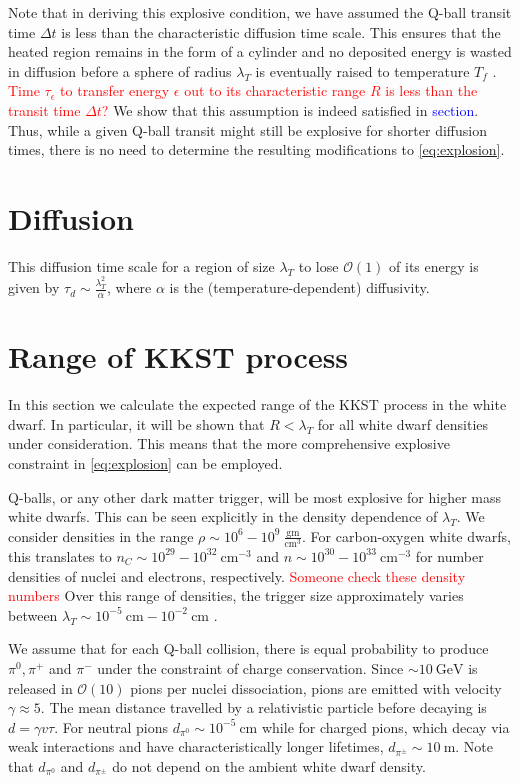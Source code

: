 \documentclass[11 pt, preprint,preprintnumbers,amsmath,amssymb, prd]{revtex4}
\newcommand{\OO}{\mathcal{O}}
\begin{document}
Note that in deriving this explosive condition, we have assumed the Q-ball transit time $\Delta t$ is less than the characteristic diffusion time scale. This ensures that the heated region remains in the form of a cylinder and no deposited energy is wasted in diffusion before a sphere of radius $\lambda_T$ is eventually raised to temperature $T_f$ . \textcolor{red}{Time $\tau_\epsilon$ to transfer energy $\epsilon$ out to its characteristic range $R$ is less than the transit time $\Delta t$?} We show that this assumption is indeed satisfied in \textcolor{blue}{section}. Thus, while a given Q-ball transit might still be explosive for shorter diffusion times, there is no need to determine the resulting modifications to \eqref{eq:explosion}. 

\section{Diffusion}
This diffusion time scale for a region of size $\lambda_T$ to lose $\OO(1)$ of its energy is given by $\tau_d \sim \frac{\lambda_T^2}{\alpha}$, where $\alpha$ is the (temperature-dependent) diffusivity. 




\section{Range of KKST process}

In this section we calculate the expected range of the KKST process in the white dwarf. In particular, it will be shown that $R < \lambda_T$ for all white dwarf densities under consideration. This means that the more comprehensive explosive constraint in \eqref{eq:explosion} can be employed. 

Q-balls, or any other dark matter trigger, will be most explosive for higher mass white dwarfs. This can be seen explicitly in the density dependence of $\lambda_T$. We consider densities in the range $\rho \sim 10^{6} - 10^{9} ~\frac{\text{gm}}{\text{cm}^3}$. For carbon-oxygen white dwarfs, this translates to $n_C \sim 10^{29} - 10^{32} ~\text{cm}^{-3}$ and $n \sim 10^{30} - 10^{33} ~\text{cm}^{-3}$ for number densities of nuclei and electrons, respectively. \textcolor{red}{Someone check these density numbers} Over this range of densities, the trigger size approximately varies between $\lambda_T \sim 10^{-5} ~\text{cm} -10^{-2} ~\text{cm}$ \cite{Varela}. 

We assume that for each Q-ball collision, there is equal probability to produce $\pi^0, \pi^+$ and $\pi^-$ under the constraint of charge conservation. Since $\sim 10 ~\text{GeV}$ is released in $\OO(10)$ pions per nuclei dissociation, pions are emitted with velocity $\gamma \approx 5$. The mean distance travelled by a relativistic particle before decaying is $d = \gamma v \tau$. For neutral pions $d_{\pi^0} \sim 10^{-5} ~\text{cm}$ while for charged pions, which decay via weak interactions and have characteristically longer lifetimes, $d_{\pi^\pm} \sim 10 ~\text{m}$. Note that $d_{\pi^0}$ and $d_{\pi^\pm}$ do not depend on the ambient white dwarf density. 
\end{document}
